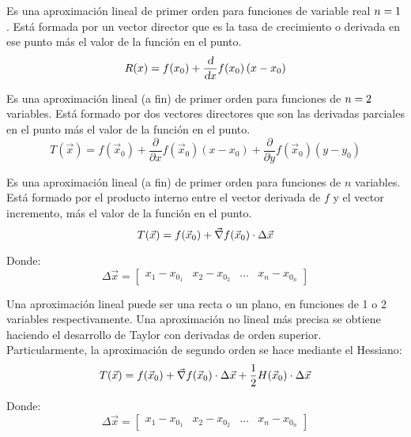 Es una aproximación lineal de primer orden para funciones de variable real $n=1$.
Está formada por un vector director que es la tasa de crecimiento o derivada en ese punto más el valor de la función en el punto.
\begin{equation*}
    R(x) = f(x_0) + \frac{\textsl{d}}{\textsl{d} x} f(x_0) \left( x-x_0 \right)
\end{equation*}


Es una aproximación lineal (a fin) de primer orden para funciones de $n=2$ variables.
Está formado por dos vectores directores que son las derivadas parciales en el punto más el valor de la función en el punto.
\begin{equation*}
    T(\Vec{x}) = f(\Vec{x}_0) + \frac{\partial}{\partial x} f(\Vec{x}_0) \left(x-x_0\right) + \frac{\partial}{\partial y} f(\Vec{x}_0) \left(y-y_0\right)
\end{equation*}


Es una aproximación lineal (a fin) de primer orden para funciones de $n$ variables.
Está formado por el producto interno entre el vector derivada de $f$ y el vector incremento, más el valor de la función en el punto.
\begin{equation*}
    T(\Vec{x}) = f(\Vec{x}_0) + \Vec{\nabla} f(\Vec{x}_0) \cdot \Delta \Vec{x}
\end{equation*}

Donde:
\begin{equation*}
    \Delta \Vec{x} = \begin{bmatrix} x_1-x_{0_1} & x_2-x_{0_2} & \dots & x_n-x_{0_n} \end{bmatrix}
\end{equation*}


Una aproximación lineal puede ser una recta o un plano, en funciones de 1 o 2 variables respectivamente.
Una aproximación no lineal más precisa se obtiene haciendo el desarrollo de Taylor con derivadas de orden superior.
Particularmente, la aproximación de segundo orden se hace mediante el Hessiano:
\begin{equation*}
    T(\Vec{x}) = f(\Vec{x}_0) + \Vec{\nabla} f(\Vec{x}_0) \cdot \Delta \Vec{x} + \frac{1}{2} H(\Vec{x}_0) \cdot \Delta \Vec{x}
\end{equation*}

Donde:
\begin{equation*}
    \Delta \Vec{x} = \begin{bmatrix} x_1-x_{0_1} & x_2-x_{0_2} & \dots & x_n-x_{0_n} \end{bmatrix}
\end{equation*}


